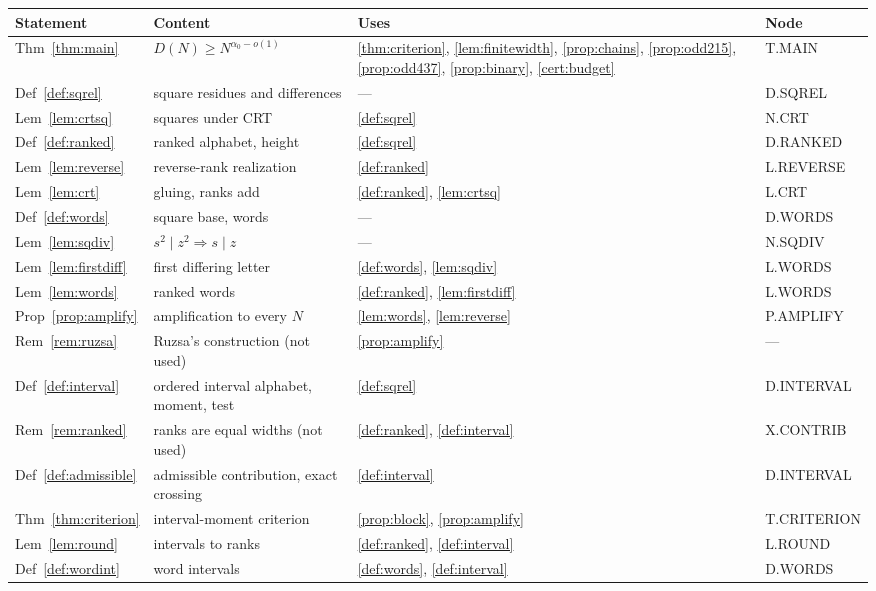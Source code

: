 \documentclass[11pt]{article}
\theoremstyle{definition}
\theoremstyle{remark}
\newcommand{\al}{\alpha_0}
\begin{document}
{\small
\begin{longtable}{@{}p{2.3cm}p{4.9cm}p{4.5cm}>{\footnotesize\ttfamily}p{2.9cm}@{}}
\toprule
Statement & Content & Uses & Node\\\midrule
\endhead
\bottomrule
\endfoot
Thm~\ref{thm:main} & $D(N)\ge N^{\al-o(1)}$ & \ref{thm:criterion}, \ref{lem:finitewidth}, \ref{prop:chains}, \ref{prop:odd215}, \ref{prop:odd437}, \ref{prop:binary}, \ref{cert:budget} & T.MAIN\\
Def~\ref{def:sqrel} & square residues and differences & --- & D.SQREL\\
Lem~\ref{lem:crtsq} & squares under CRT & \ref{def:sqrel} & N.CRT\\
Def~\ref{def:ranked} & ranked alphabet, height & \ref{def:sqrel} & D.RANKED\\
Lem~\ref{lem:reverse} & reverse-rank realization & \ref{def:ranked} & L.REVERSE\\
Lem~\ref{lem:crt} & gluing, ranks add & \ref{def:ranked}, \ref{lem:crtsq} & L.CRT\\
Def~\ref{def:words} & square base, words & --- & D.WORDS\\
Lem~\ref{lem:sqdiv} & $s^2\mid z^2\Rightarrow s\mid z$ & --- & N.SQDIV\\
Lem~\ref{lem:firstdiff} & first differing letter & \ref{def:words}, \ref{lem:sqdiv} & L.WORDS\\
Lem~\ref{lem:words} & ranked words & \ref{def:ranked}, \ref{lem:firstdiff} & L.WORDS\\
Prop~\ref{prop:amplify} & amplification to every $N$ & \ref{lem:words}, \ref{lem:reverse} & P.AMPLIFY\\
Rem~\ref{rem:ruzsa} & Ruzsa's construction (not used) & \ref{prop:amplify} & ---\\
Def~\ref{def:interval} & ordered interval alphabet, moment, test & \ref{def:sqrel} & D.INTERVAL\\
Rem~\ref{rem:ranked} & ranks are equal widths (not used) & \ref{def:ranked}, \ref{def:interval} & X.CONTRIB\\
Def~\ref{def:admissible} & admissible contribution, exact crossing & \ref{def:interval} & D.INTERVAL\\
Thm~\ref{thm:criterion} & interval-moment criterion & \ref{prop:block}, \ref{prop:amplify} & T.CRITERION\\
Lem~\ref{lem:round} & intervals to ranks & \ref{def:ranked}, \ref{def:interval} & L.ROUND\\
Def~\ref{def:wordint} & word intervals & \ref{def:words}, \ref{def:interval} & D.WORDS\\

\end{longtable}}
\end{document}
